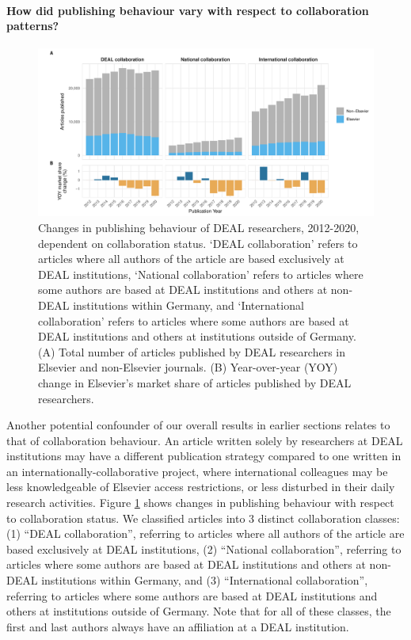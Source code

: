 \documentclass[
]{article}
\begin{document}
\hypertarget{how-did-publishing-behaviour-vary-with-respect-to-collaboration-patterns}{%
\paragraph{How did publishing behaviour vary with respect to collaboration patterns?}\label{how-did-publishing-behaviour-vary-with-respect-to-collaboration-patterns}}

\begin{figure}
\centering
\includegraphics{analysis_files/figure-latex/items-publisher-year-collaboration-1.pdf}
\caption{\label{fig:items-publisher-year-collaboration}Changes in publishing behaviour of DEAL researchers, 2012-2020, dependent on collaboration status. `DEAL collaboration' refers to articles where all authors of the article are based exclusively at DEAL institutions, `National collaboration' refers to articles where some authors are based at DEAL institutions and others at non-DEAL institutions within Germany, and `International collaboration' refers to articles where some authors are based at DEAL institutions and others at institutions outside of Germany. (A) Total number of articles published by DEAL researchers in Elsevier and non-Elsevier journals. (B) Year-over-year (YOY) change in Elsevier's market share of articles published by DEAL researchers.}
\end{figure}

Another potential confounder of our overall results in earlier sections relates to that of collaboration behaviour. An article written solely by researchers at DEAL institutions may have a different publication strategy compared to one written in an internationally-collaborative project, where international colleagues may be less knowledgeable of Elsevier access restrictions, or less disturbed in their daily research activities. Figure \ref{fig:items-publisher-year-collaboration} shows changes in publishing behaviour with respect to collaboration status. We classified articles into 3 distinct collaboration classes: (1) ``DEAL collaboration'', referring to articles where all authors of the article are based exclusively at DEAL institutions, (2) ``National collaboration'', referring to articles where some authors are based at DEAL institutions and others at non-DEAL institutions within Germany, and (3) ``International collaboration'', referring to articles where some authors are based at DEAL institutions and others at institutions outside of Germany. Note that for all of these classes, the first and last authors always have an affiliation at a DEAL institution.
\end{document}
